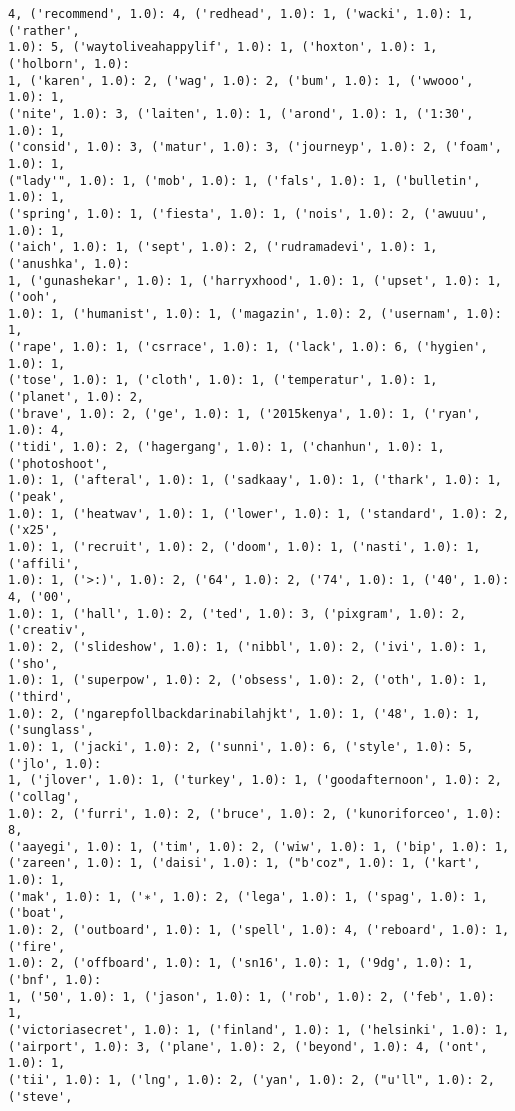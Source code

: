 \documentclass[11pt]{article}
\begin{document}
\begin{Verbatim}[commandchars=\\\{\}]
4, ('recommend', 1.0): 4, ('redhead', 1.0): 1, ('wacki', 1.0): 1, ('rather',
1.0): 5, ('waytoliveahappylif', 1.0): 1, ('hoxton', 1.0): 1, ('holborn', 1.0):
1, ('karen', 1.0): 2, ('wag', 1.0): 2, ('bum', 1.0): 1, ('wwooo', 1.0): 1,
('nite', 1.0): 3, ('laiten', 1.0): 1, ('arond', 1.0): 1, ('1:30', 1.0): 1,
('consid', 1.0): 3, ('matur', 1.0): 3, ('journeyp', 1.0): 2, ('foam', 1.0): 1,
("lady'", 1.0): 1, ('mob', 1.0): 1, ('fals', 1.0): 1, ('bulletin', 1.0): 1,
('spring', 1.0): 1, ('fiesta', 1.0): 1, ('nois', 1.0): 2, ('awuuu', 1.0): 1,
('aich', 1.0): 1, ('sept', 1.0): 2, ('rudramadevi', 1.0): 1, ('anushka', 1.0):
1, ('gunashekar', 1.0): 1, ('harryxhood', 1.0): 1, ('upset', 1.0): 1, ('ooh',
1.0): 1, ('humanist', 1.0): 1, ('magazin', 1.0): 2, ('usernam', 1.0): 1,
('rape', 1.0): 1, ('csrrace', 1.0): 1, ('lack', 1.0): 6, ('hygien', 1.0): 1,
('tose', 1.0): 1, ('cloth', 1.0): 1, ('temperatur', 1.0): 1, ('planet', 1.0): 2,
('brave', 1.0): 2, ('ge', 1.0): 1, ('2015kenya', 1.0): 1, ('ryan', 1.0): 4,
('tidi', 1.0): 2, ('hagergang', 1.0): 1, ('chanhun', 1.0): 1, ('photoshoot',
1.0): 1, ('afteral', 1.0): 1, ('sadkaay', 1.0): 1, ('thark', 1.0): 1, ('peak',
1.0): 1, ('heatwav', 1.0): 1, ('lower', 1.0): 1, ('standard', 1.0): 2, ('x25',
1.0): 1, ('recruit', 1.0): 2, ('doom', 1.0): 1, ('nasti', 1.0): 1, ('affili',
1.0): 1, ('>:)', 1.0): 2, ('64', 1.0): 2, ('74', 1.0): 1, ('40', 1.0): 4, ('00',
1.0): 1, ('hall', 1.0): 2, ('ted', 1.0): 3, ('pixgram', 1.0): 2, ('creativ',
1.0): 2, ('slideshow', 1.0): 1, ('nibbl', 1.0): 2, ('ivi', 1.0): 1, ('sho',
1.0): 1, ('superpow', 1.0): 2, ('obsess', 1.0): 2, ('oth', 1.0): 1, ('third',
1.0): 2, ('ngarepfollbackdarinabilahjkt', 1.0): 1, ('48', 1.0): 1, ('sunglass',
1.0): 1, ('jacki', 1.0): 2, ('sunni', 1.0): 6, ('style', 1.0): 5, ('jlo', 1.0):
1, ('jlover', 1.0): 1, ('turkey', 1.0): 1, ('goodafternoon', 1.0): 2, ('collag',
1.0): 2, ('furri', 1.0): 2, ('bruce', 1.0): 2, ('kunoriforceo', 1.0): 8,
('aayegi', 1.0): 1, ('tim', 1.0): 2, ('wiw', 1.0): 1, ('bip', 1.0): 1,
('zareen', 1.0): 1, ('daisi', 1.0): 1, ("b'coz", 1.0): 1, ('kart', 1.0): 1,
('mak', 1.0): 1, ('∗', 1.0): 2, ('lega', 1.0): 1, ('spag', 1.0): 1, ('boat',
1.0): 2, ('outboard', 1.0): 1, ('spell', 1.0): 4, ('reboard', 1.0): 1, ('fire',
1.0): 2, ('offboard', 1.0): 1, ('sn16', 1.0): 1, ('9dg', 1.0): 1, ('bnf', 1.0):
1, ('50', 1.0): 1, ('jason', 1.0): 1, ('rob', 1.0): 2, ('feb', 1.0): 1,
('victoriasecret', 1.0): 1, ('finland', 1.0): 1, ('helsinki', 1.0): 1,
('airport', 1.0): 3, ('plane', 1.0): 2, ('beyond', 1.0): 4, ('ont', 1.0): 1,
('tii', 1.0): 1, ('lng', 1.0): 2, ('yan', 1.0): 2, ("u'll", 1.0): 2, ('steve',

\end{Verbatim}
\end{document}
